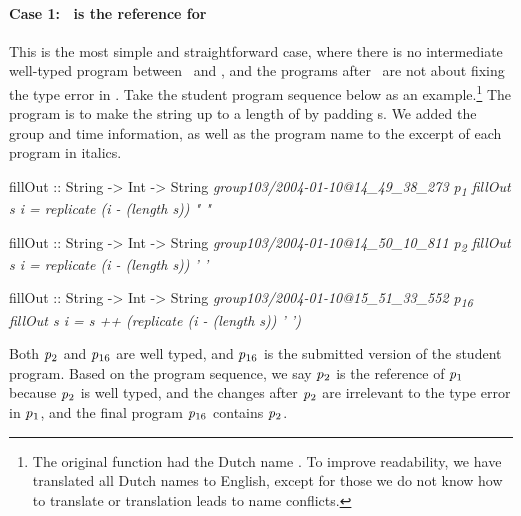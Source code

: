 \documentclass[12pt]{report}	%
\begin{document}

\paragraph{Case 1: \pgj\ is the reference for \pgi}
This is the most simple and straightforward case, 
where there is no intermediate well-typed program between 
\pgi\ and \pgj, and the programs after \pgj\ are not about 
fixing the type error in \pgi.
Take the student program sequence below as an example.\footnote{The original function had the Dutch name . To improve
readability, we have translated all Dutch names to English, except
for those we do not know how to translate or translation leads to name conflicts.}
The program is to make the string
 up to a length of  by
padding \progsq{\,}s.
We added the group and time information,
as well as the program name to the excerpt of each program in italics.
%
\begin{program}
fillOut :: String -> Int -> String \hfill \it{group103/2004-01-10@14_49_38_273 \quad p\textsubscript{1}}
fillOut s i = replicate (i - (length s)) " "

fillOut :: String -> Int -> String \hfill \it{group103/2004-01-10@14_50_10_811 \quad p\textsubscript{2}}
fillOut s i = replicate (i - (length s)) ' '

fillOut :: String -> Int -> String \hfill \it{group103/2004-01-10@15_51_33_552 \quad p\textsubscript{16}}
fillOut s i = s ++ (replicate (i - (length s)) ' ')
\end{program}
%
Both $\it{p\textsubscript{2}}$ and $\it{p\textsubscript{16}}$ are well typed, 
and $\it{p\textsubscript{16}}$ is the submitted version of the student program.
Based on the program sequence, we say
$\it{p\textsubscript{2}}$ is the reference of $\it{p\textsubscript{1}}$
because $\it{p\textsubscript{2}}$ is well typed,
and the changes after $\it{p\textsubscript{2}}$ are irrelevant to
the type error in $\it{p\textsubscript{1}}$,
and the final program $\it{p\textsubscript{16}}$ contains $\it{p\textsubscript{2}}$.
\end{document}
